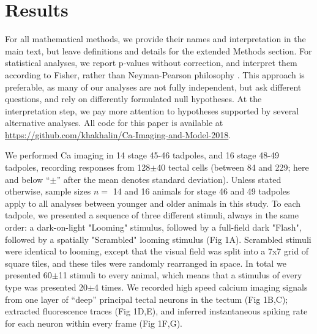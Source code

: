 \documentclass{article}
\begin{document}
\section*{Results}

For all mathematical methods, we provide their names and interpretation in the main text, but leave definitions and details for the extended Methods section. For statistical analyses, we report p-values without correction, and interpret them according to Fisher, rather than Neyman-Pearson philosophy \citep{greenland2016}. This approach is preferable, as many of our analyses are not fully independent, but ask different questions, and rely on differently formulated null hypotheses. At the interpretation step, we pay more attention to hypotheses supported by several alternative analyses. All code for this paper is available at \url{https://github.com/khakhalin/Ca-Imaging-and-Model-2018}.


We performed Ca imaging in 14 stage 45-46 tadpoles, and 16 stage 48-49 tadpoles, recording responses from 128$\pm$40 tectal cells (between 84 and 229; here and below “$\pm$” after the mean denotes standard deviation). Unless stated otherwise, sample sizes $n=$ 14 and 16 animals for stage 46 and 49 tadpoles apply to all analyses between younger and older animals in this study. To each tadpole, we presented a sequence of three different stimuli, always in the same order: a dark-on-light "Looming" stimulus, followed by a full-field dark "Flash", followed by a spatially "Scrambled" looming stimulus (Fig 1A). Scrambled stimuli were identical to looming, except that the visual field was split into a 7x7 grid of square tiles, and these tiles were randomly rearranged in space. In total we presented 60$\pm$11 stimuli to every animal, which means that a stimulus of every type was presented 20$\pm$4 times. We recorded high speed calcium imaging signals \citep{xu2011,truszkowski2017} from one layer of “deep” principal tectal neurons in the tectum (Fig 1B,C); extracted fluorescence traces (Fig 1D,E), and inferred instantaneous spiking rate for each neuron within every frame (Fig 1F,G).
\end{document}
